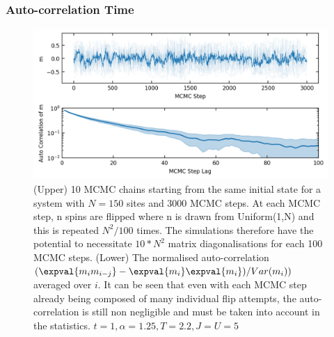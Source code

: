\hypertarget{auto-correlation-time}{%
\subsubsection{Auto-correlation Time}\label{auto-correlation-time}}

\hypertarget{fig:m_autocorr}{%
\begin{figure}
\centering
\includegraphics[width=1\textwidth,height=\textheight]{../figure_code/fk_chapter/lsr/figs/m_autocorr.png}
\caption[{no title}]{(Upper) 10 MCMC chains starting from the same initial state for a system with \(N = 150\) sites and 3000 MCMC steps. At each MCMC step, n spins are flipped where n is drawn from Uniform(1,N) and this is repeated \(N^2/100\) times. The simulations therefore have the potential to necessitate \(10*N^2\) matrix diagonalisations for each 100 MCMC steps. (Lower) The normalised auto-correlation \((\expval{m_i m_{i-j}} - \expval{m_i}\expval{m_i}) / Var(m_i))\) averaged over \(i\). It can be seen that even with each MCMC step already being composed of many individual flip attempts, the auto-correlation is still non negligible and must be taken into account in the statistics. \(t = 1, \alpha = 1.25, T = 2.2, J = U = 5\)}
\label{fig:m_autocorr}
\end{figure}
}


